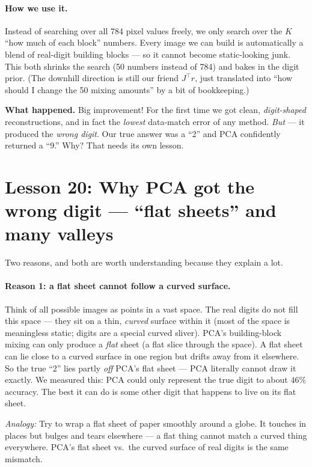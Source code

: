 \documentclass[11pt]{article}
\newcommand{\analogy}[1]{\par\smallskip\noindent\textit{Analogy:} #1\par\smallskip}
\begin{document}
\paragraph{How we use it.} Instead of searching over all 784 pixel values
freely, we only search over the $K$ ``how much of each block'' numbers. Every
image we can build is automatically a blend of real-digit building blocks ---
so it cannot become static-looking junk. This both shrinks the search (50
numbers instead of 784) and bakes in the digit prior. (The downhill direction
is still our friend $J^\top r$, just translated into ``how should I change the
50 mixing amounts'' by a bit of bookkeeping.)

\textbf{What happened.} Big improvement! For the first time we got clean,
\emph{digit-shaped} reconstructions, and in fact the \emph{lowest} data-match
error of any method. \emph{But} --- it produced the \emph{wrong digit}. Our
true answer was a ``2'' and PCA confidently returned a ``9.'' Why? That needs
its own lesson.

\section{Lesson 20: Why PCA got the wrong digit --- ``flat sheets'' and many valleys}

Two reasons, and both are worth understanding because they explain a lot.

\paragraph{Reason 1: a flat sheet cannot follow a curved surface.} Think of
all possible images as points in a vast space. The real digits do not fill
this space --- they sit on a thin, \emph{curved} surface within it (most of the
space is meaningless static; digits are a special curved sliver). PCA's
building-block mixing can only produce a \emph{flat} sheet (a flat slice
through the space). A flat sheet can lie close to a curved surface in one
region but drifts away from it elsewhere. So the true ``2'' lies partly
\emph{off} PCA's flat sheet --- PCA literally cannot draw it exactly. We
measured this: PCA could only represent the true digit to about $46\%$
accuracy. The best it can do is some other digit that happens to live on its
flat sheet.

\analogy{Try to wrap a flat sheet of paper smoothly around a globe. It touches
in places but bulges and tears elsewhere --- a flat thing cannot match a curved
thing everywhere. PCA's flat sheet vs.\ the curved surface of real digits is
the same mismatch.}
\end{document}
